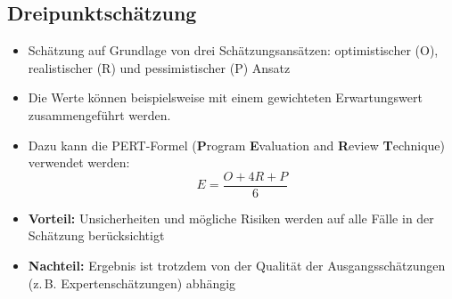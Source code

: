 \documentclass[a4paper,10pt]{article}
\begin{document}
        \par\noindent\begin{minipage}{\linewidth}
\subsection*{Dreipunktschätzung}
        \begin{itemize}
            \item Schätzung auf Grundlage von drei Schätzungsansätzen: optimistischer (O), realistischer (R) und pessimistischer (P) Ansatz
            \item Die Werte können beispielsweise mit einem gewichteten Erwartungswert zusammengeführt werden.
            \item Dazu kann die PERT-Formel (\textbf{P}rogram \textbf{E}valuation and \textbf{R}eview \textbf{T}echnique) verwendet werden: \[ E = \frac{O+4R+P}{6}\]
            \item \textbf{Vorteil:} Unsicherheiten und mögliche Risiken werden auf alle Fälle in der Schätzung berücksichtigt
            \item \textbf{Nachteil:} Ergebnis ist trotzdem von der Qualität der Ausgangsschätzungen (z.\,B. Expertenschätzungen) abhängig
        \end{itemize}
\end{minipage}\par
\end{document}
